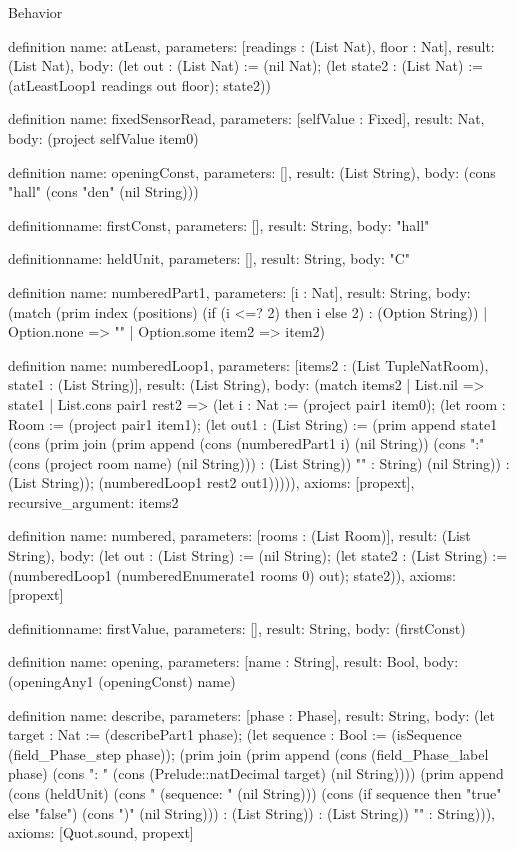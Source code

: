 \begin{lexlean}{Behavior}
\begin{semanticmodule}
definition{
  name: atLeast,
  parameters: [readings : (List Nat), floor : Nat],
  result: (List Nat),
  body: (let out : (List Nat) := (nil Nat); (let state2 : (List Nat) := (atLeastLoop1 readings out floor); state2))
}

definition{
  name: fixedSensorRead,
  parameters: [selfValue : Fixed],
  result: Nat,
  body: (project selfValue item0)
}

definition{
  name: openingConst,
  parameters: [],
  result: (List String),
  body: (cons "hall" (cons "den" (nil String)))
}

definition{name: firstConst, parameters: [], result: String, body: "hall"}

definition{name: heldUnit, parameters: [], result: String, body: "C"}

definition{
  name: numberedPart1,
  parameters: [i : Nat],
  result: String,
  body: (match (prim index (positions) (if (i <=? 2) then i else 2) : (Option String))
    | Option.none => ""
    | Option.some item2 => item2)
}

definition{
  name: numberedLoop1,
  parameters: [items2 : (List TupleNatRoom), state1 : (List String)],
  result: (List String),
  body: (match items2
    | List.nil => state1
    | List.cons pair1 rest2 => (let i : Nat := (project pair1 item0); (let room : Room := (project pair1 item1); (let out1 : (List String) := (prim append state1 (cons (prim join (prim append (cons (numberedPart1 i) (nil String)) (cons ":" (cons (project room name) (nil String))) : (List String)) "" : String) (nil String)) : (List String)); (numberedLoop1 rest2 out1))))),
  axioms: [propext],
  recursive_argument: items2
}

definition{
  name: numbered,
  parameters: [rooms : (List Room)],
  result: (List String),
  body: (let out : (List String) := (nil String); (let state2 : (List String) := (numberedLoop1 (numberedEnumerate1 rooms 0) out); state2)),
  axioms: [propext]
}

definition{name: firstValue, parameters: [], result: String, body: (firstConst)}

definition{
  name: opening,
  parameters: [name : String],
  result: Bool,
  body: (openingAny1 (openingConst) name)
}

definition{
  name: describe,
  parameters: [phase : Phase],
  result: String,
  body: (let target : Nat := (describePart1 phase); (let sequence : Bool := (isSequence (field_Phase_step phase)); (prim join (prim append (cons (field_Phase_label phase) (cons ": " (cons (Prelude::natDecimal target) (nil String)))) (prim append (cons (heldUnit) (cons " (sequence: " (nil String))) (cons (if sequence then "true" else "false") (cons ")" (nil String))) : (List String)) : (List String)) "" : String))),
  axioms: [Quot.sound, propext]
}


\end{semanticmodule}
\end{lexlean}
